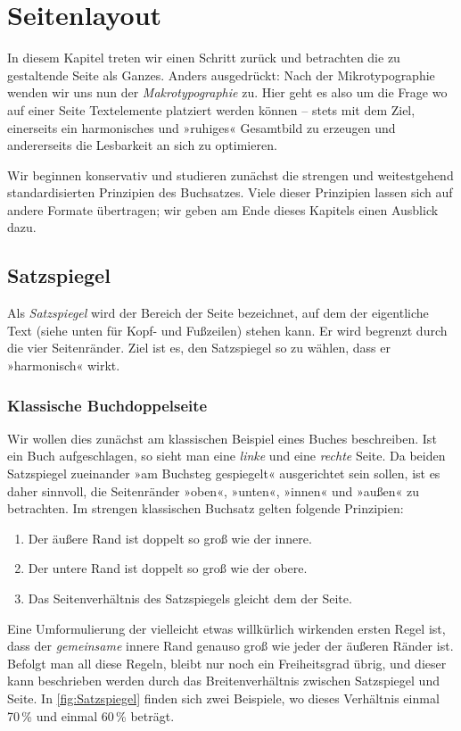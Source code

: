 \chapter{Seitenlayout}

In diesem Kapitel treten wir einen Schritt zurück und betrachten die zu
gestaltende Seite als Ganzes. Anders ausgedrückt: Nach der
Mikrotypographie wenden wir uns nun der \emph{Makrotypographie} zu. Hier geht es also um
die Frage wo auf einer Seite Textelemente platziert werden können – stets mit
dem Ziel, einerseits ein harmonisches und »ruhiges« Gesamtbild zu erzeugen und
andererseits die Lesbarkeit an sich zu optimieren.

Wir beginnen konservativ und studieren zunächst die strengen und weitestgehend
standardisierten Prinzipien des Buchsatzes. Viele dieser Prinzipien lassen sich
auf andere Formate übertragen; wir geben am Ende dieses Kapitels einen Ausblick
dazu.

\section{Satzspiegel}

Als \emph{Satzspiegel} wird der Bereich der Seite bezeichnet, auf dem der
eigentliche Text (siehe unten für Kopf- und Fußzeilen) stehen kann. Er wird
begrenzt durch die vier Seitenränder. Ziel ist es, den Satzspiegel so zu wählen,
dass er »harmonisch« wirkt.

\subsection{Klassische Buchdoppelseite}

Wir wollen dies zunächst am klassischen Beispiel eines Buches beschreiben. Ist
ein Buch aufgeschlagen, so sieht man eine \emph{linke} und eine \emph{rechte}
Seite. Da beiden Satzspiegel zueinander »am Buchsteg gespiegelt« ausgerichtet
sein sollen, ist es daher sinnvoll, die Seitenränder »oben«, »unten«, »innen«
und »außen« zu betrachten. Im strengen klassischen Buchsatz gelten folgende
Prinzipien:
\begin{enumerate}
\item Der äußere Rand ist doppelt so groß wie der innere.
\item Der untere Rand ist doppelt so groß wie der obere.
\item Das Seitenverhältnis des Satzspiegels gleicht dem der Seite.
\end{enumerate}
Eine Umformulierung der vielleicht etwas willkürlich wirkenden ersten Regel ist,
dass der \emph{gemeinsame} innere Rand genauso groß wie jeder der äußeren Ränder
ist. Befolgt man all diese Regeln, bleibt nur noch ein Freiheitsgrad übrig, und
dieser kann beschrieben werden durch das Breitenverhältnis zwischen Satzspiegel
und Seite. In \cref{fig:Satzspiegel} finden sich zwei Beispiele, wo dieses
Verhältnis einmal 70\,\% und einmal 60\,\% beträgt.

